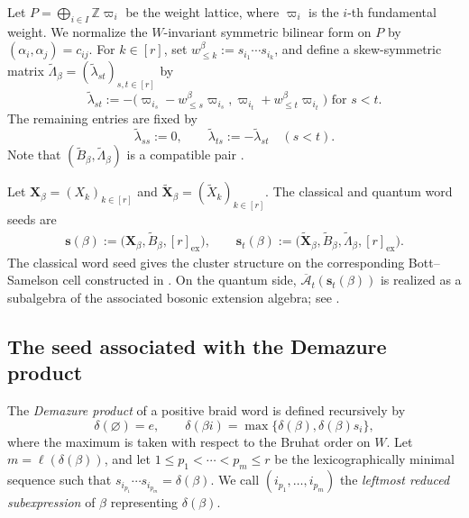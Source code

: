 \documentclass[12pt, reqno]{amsart}
\theoremstyle{plain}
\theoremstyle{definition}
\numberwithin{equation}{section}
\newcommand{\ZZ}{\mathbb{Z}}
\begin{document}
Let \(P=\bigoplus_{i\in I}\ZZ\varpi_i\) be the weight lattice, where
\(\varpi_i\) is the \(i\)-th fundamental weight. We normalize the
\(W\)-invariant symmetric bilinear form on \(P\) by
\((\alpha_i,\alpha_j)=c_{ij}\). For \(k\in[r]\), set
\(w_{\leq k}^\beta:=s_{i_1}\cdots s_{i_k}\), and define a skew-symmetric matrix
\(\widetilde\Lambda_\beta=(\widetilde\lambda_{st})_{s,t\in[r]}\) by
\begin{equation}\label{eq:Lambda-beta-word}
    \widetilde\lambda_{st}
    :=-\bigl(
        \varpi_{i_s}-w_{\leq s}^\beta\varpi_{i_s},
        \varpi_{i_t}+w_{\leq t}^\beta\varpi_{i_t}
    \bigr) \text{ for }s<t.
\end{equation}
The remaining entries are fixed by
\begin{equation}\label{eq:Lambda-beta-word-skew-extension}
    \widetilde\lambda_{ss}:=0,
    \qquad
    \widetilde\lambda_{ts}:=-\widetilde\lambda_{st}
    \quad(s<t).
\end{equation}
Note that
\((\widetilde B_\beta,\widetilde\Lambda_\beta)\) is a compatible pair
\cite{fujita2023isomorphisms}.

Let \(\mathbf X_\beta=(X_k)_{k\in[r]}\) and
\(\widetilde{\mathbf X}_\beta=(\widetilde X_k)_{k\in[r]}\). The
classical and quantum word seeds are
\begin{equation}\label{eq:seedbeta}
    \begin{aligned}
        \mathbf s(\beta)
        :=\bigl(\mathbf X_\beta,
            \widetilde B_\beta,[r]_{\mathrm{ex}}\bigr),\qquad
        \mathbf s_t(\beta)
        :=\bigl(\widetilde{\mathbf X}_\beta,
            \widetilde B_\beta,\widetilde\Lambda_\beta,
            [r]_{\mathrm{ex}}\bigr).
    \end{aligned}
\end{equation}
The classical word seed gives the cluster structure on the corresponding
Bott--Samelson cell constructed in \cite{shen2021cluster}. On the quantum
side, \(\overline{\mathcal A}_t(\mathbf s_t(\beta))\) is realized as a
subalgebra of the associated bosonic extension algebra; see
\cite{qin2024analogs,kashiwara2025monoidal,bi2025cluster}.

\subsection{The seed associated with the Demazure product}

The \emph{Demazure product} of a positive braid word is defined recursively
by
\begin{equation}\label{eq:demazure-product}
    \delta(\varnothing)=e,
    \qquad
    \delta(\beta i)
    =\max\{\delta(\beta),\delta(\beta)s_i\},
\end{equation}
where the maximum is taken with respect to the Bruhat order on \(W\).
Let \(m=\ell(\delta(\beta))\), and let
\(1\leq p_1<\cdots<p_m\leq r\) be the lexicographically minimal
sequence such that
\(s_{i_{p_1}}\cdots s_{i_{p_m}}=\delta(\beta)\). We call
\((i_{p_1},\ldots,i_{p_m})\) the \emph{leftmost reduced
subexpression} of \(\beta\) representing \(\delta(\beta)\).
\end{document}
